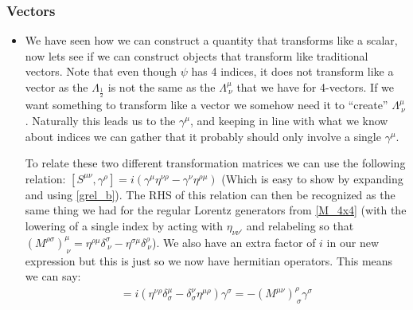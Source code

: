 \documentclass[11pt]{article}
\numberwithin{equation}{section}
\begin{document}
\subsubsection{Vectors}
\begin{itemize}
  \item We have seen how we can construct a quantity that transforms like a scalar, now lets see if we can construct objects that transform like traditional vectors. Note that even though $\psi$ has 4 indices, it does not transform like a vector as the $\Lambda_{\frac{1}{2}}$ is not the same as the $\Lambda^{\mu}_{~\nu}$ that we have for 4-vectors. If we want something to transform like a vector we somehow need it to ``create'' $\Lambda^{\mu}_{~\nu}$. Naturally this leads us to the $\gamma^{\mu}$, and keeping in line with what we know about indices we can gather that it probably should only involve a single $\gamma^{\mu}$. 

  To relate these two different transformation matrices we can use the following relation: $[S^{\mu\nu},\gamma^{\rho}] = i(\gamma^{\mu}\eta^{\nu\rho}-\gamma^{\nu}\eta^{\rho\mu})$ (Which is easy to show by expanding and using \ref{grel_b}). The RHS of this relation can then be recognized as the same thing we had for the regular Lorentz generators from \ref{M_4x4} (with the lowering of a single index by acting with $\eta_{\nu\nu'}$ and relabeling so that $(M^{\rho\sigma})^{\mu}_{~\nu} = \eta^{\rho\mu}\delta^{\sigma}_{~\nu}-\eta^{\sigma\mu}\delta^{\rho}_{~\nu}$). We also have an extra factor of $i$ in our new expression but this is just so we now have hermitian operators.  This means we can say:
  \begin{align*}
     [S^{\mu\nu},\gamma^{\rho}] = i(\eta^{\nu\rho}\delta^{\mu}_{\sigma}-\delta^{\nu}_{\sigma}\eta^{\mu\rho})\gamma^{\sigma} = -(M^{\mu\nu})^{\rho}_{~\sigma}\gamma^{\sigma}
   \end{align*} 
\end{itemize}
\end{document}
